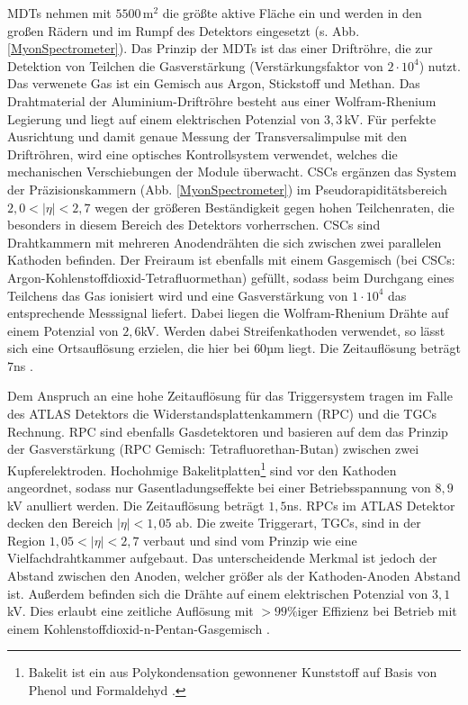 MDTs nehmen mit $5500\,$m$^2$  die größte aktive Fläche ein und werden in den großen Rädern und im Rumpf des Detektors eingesetzt (s. Abb. \ref{MyonSpectrometer}). Das Prinzip der MDTs ist das einer Driftröhre, die zur Detektion von Teilchen die Gasverstärkung (Verstärkungsfaktor von $2\cdot10^4$) nutzt. Das verwenete Gas ist ein Gemisch aus Argon, Stickstoff und Methan. Das Drahtmaterial der Aluminium-Driftröhre besteht aus einer Wolfram-Rhenium Legierung und liegt auf einem elektrischen Potenzial von $3,3\,$kV. Für perfekte Ausrichtung und damit genaue Messung der Transversalimpulse mit den Driftröhren, wird eine optisches Kontrollsystem verwendet, welches die mechanischen Verschiebungen der Module überwacht. CSCs ergänzen das System der Präzisionskammern (Abb. \ref{MyonSpectrometer}) im Pseudorapiditätsbereich $2,0<|\eta|<2,7$ wegen der größeren Beständigkeit gegen hohen Teilchenraten, die besonders in diesem Be\-reich des Detektors vorherrschen. CSCs sind Drahtkammern mit mehreren Anodendrähten die sich zwischen zwei parallelen Kathoden befinden. Der Freiraum ist ebenfalls mit einem Gasgemisch (bei CSCs: Argon-Kohlenstoffdioxid-Tetrafluormethan) gefüllt, sodass beim Durchgang eines Teilchens das Gas ionisiert wird und eine Gasverstärkung von $1\cdot10^4$ das entsprechende Messsignal liefert. Dabei liegen die Wolfram-Rhenium Drähte auf einem Potenzial von $2,6$kV. Werden dabei Streifen\-ka\-thoden verwendet, so lässt sich eine Ortsauflösung erzielen, die hier bei $60$µm liegt. Die Zeitauflösung beträgt $7$ns \cite{MS}.

Dem Anspruch an eine hohe Zeitauflösung für das Triggersystem tragen im Falle des ATLAS Detektors die Widerstandsplattenkammern (RPC) und die TGCs Rechnung. RPC sind ebenfalls Gasdetektoren und basieren auf dem das Prinzip der Gasverstärkung (RPC Gemisch: Tetrafluorethan-Butan) zwischen zwei Kupferelektroden. Hochohmige Bakelitplatten\footnote{Bakelit ist ein aus Polykondensation gewonnener Kunststoff auf Basis von Phenol und Formaldehyd \cite{Bakelit}.} sind vor den Kathoden angeordnet, sodass nur Gasentladungseffekte bei einer Betriebsspannung von $8,9$kV anulliert werden. Die Zeitauflösung beträgt $1,5$ns. RPCs im ATLAS Detektor decken den Bereich $|\eta|<1,05$ ab. Die zweite Triggerart, TGCs, sind in der Region $1,05<|\eta|<2,7$ verbaut und sind vom Prinzip wie eine Vielfachdrahtkammer aufgebaut. Das unterscheidende Merkmal ist jedoch der Abstand zwischen den Anoden, welcher größer als der Kathoden-Anoden Abstand ist. Außerdem befinden sich die Drähte auf einem elektrischen Potenzial von $3,1$kV. Dies erlaubt eine zeitliche Auflösung mit $>99\%$iger Effizienz bei Betrieb mit einem Kohlenstoffdioxid-n-Pentan-Gasgemisch \cite{MS}\cite{PhysTeV}.

